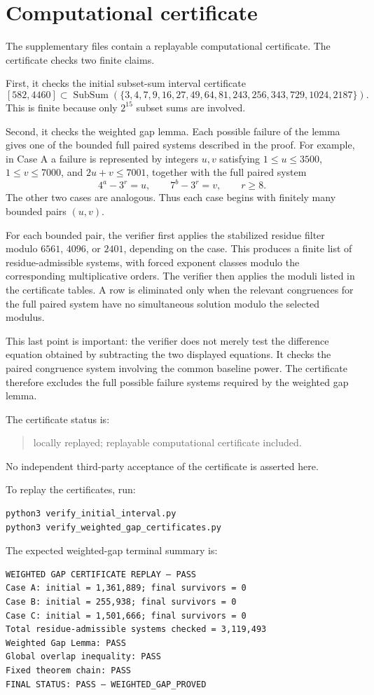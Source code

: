 \documentclass[11pt]{article}
\DeclareMathOperator{\SubSum}{SubSum}
\begin{document}
\section{Computational certificate}

The supplementary files contain a replayable computational certificate.  The
certificate checks two finite claims.

First, it checks the initial subset-sum interval certificate
\[
[582,4460]\subset
\SubSum(\{3,4,7,9,16,27,49,64,81,243,256,343,729,1024,2187\}).
\]
This is finite because only \(2^{15}\) subset sums are involved.

Second, it checks the weighted gap lemma.  Each possible failure of the lemma gives
one of the bounded full paired systems described in the proof.  For example, in
Case A a failure is represented by integers \(u,v\) satisfying
\(1\le u\le3500\), \(1\le v\le7000\), and \(2u+v\le7001\), together with the full
paired system
\[
4^a-3^r=u,\qquad 7^b-3^r=v,\qquad r\ge8.
\]
The other two cases are analogous.  Thus each case begins with finitely many
bounded pairs \((u,v)\).

For each bounded pair, the verifier first applies the stabilized residue filter
modulo \(6561\), \(4096\), or \(2401\), depending on the case.  This produces a
finite list of residue-admissible systems, with forced exponent classes modulo the
corresponding multiplicative orders.  The verifier then applies the moduli listed
in the certificate tables.  A row is eliminated only when the relevant congruences
for the full paired system have no simultaneous solution modulo the selected
modulus.

This last point is important: the verifier does not merely test the difference
equation obtained by subtracting the two displayed equations.  It checks the
paired congruence system involving the common baseline power.  The certificate
therefore excludes the full possible failure systems required by the weighted gap
lemma.

The certificate status is:

\begin{quote}
locally replayed; replayable computational certificate included.
\end{quote}

No independent third-party acceptance of the certificate is asserted here.

To replay the certificates, run:
\begin{verbatim}
python3 verify_initial_interval.py
python3 verify_weighted_gap_certificates.py
\end{verbatim}
The expected weighted-gap terminal summary is:
\begin{verbatim}
WEIGHTED GAP CERTIFICATE REPLAY — PASS
Case A: initial = 1,361,889; final survivors = 0
Case B: initial = 255,938; final survivors = 0
Case C: initial = 1,501,666; final survivors = 0
Total residue-admissible systems checked = 3,119,493
Weighted Gap Lemma: PASS
Global overlap inequality: PASS
Fixed theorem chain: PASS
FINAL STATUS: PASS — WEIGHTED_GAP_PROVED
\end{verbatim}
\end{document}
